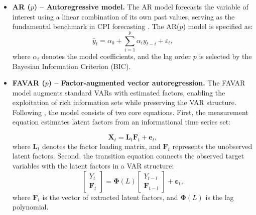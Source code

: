 \documentclass[12pt]{article}
\begin{document}
  \begin{itemize}
      \item \textbf{AR ($p$) -- Autoregressive model.} The AR model forecasts the variable of interest using a linear combination of its own past values, serving as the fundamental benchmark in CPI forecasting \citep{box1970time}. The AR($p$) model is specified as:
      \begin{equation}
      \hat{y}_{t} = \alpha_0 + \sum_{i=1}^{p} \alpha_i y_{t-i} + \varepsilon_{t},
      \end{equation}
      where $\alpha_i$ denotes the model coefficients, and the lag order $p$ is selected by the Bayesian Information Criterion (BIC).

      \item \textbf{FAVAR ($p$) -- Factor-augmented vector autoregression.} The FAVAR model augments standard VARs with estimated factors, enabling the exploitation of rich information sets while preserving the VAR structure. Following \citet{bernanke2005measuring}, the model consists of two core equations. First, the measurement equation estimates latent factors from an informational time series set:

       \begin{equation}
        \mathbf{X}_t = \mathbf{L}_t \mathbf{F}_t + \mathbf{e}_t,
       \end{equation}
      where $\mathbf{L}_t$ denotes the factor loading matrix, and $\mathbf{F}_t$ represents the unobserved latent factors. Second, the transition equation connects the observed target variables with the latent factors in a VAR structure:
       \begin{equation}
        \begin{bmatrix} Y_t \\ \mathbf{F}_t \end{bmatrix} = \boldsymbol{\Phi}(L) \begin{bmatrix} Y_{t-l} \\ \mathbf{F}_{t-l} \end{bmatrix} + \boldsymbol{\varepsilon}_t,
       \end{equation}
       where $\mathbf{F}_t$ is the vector of extracted latent factors, and $\boldsymbol{\Phi}(L)$ is the lag polynomial.



\end{itemize}
\end{document}
